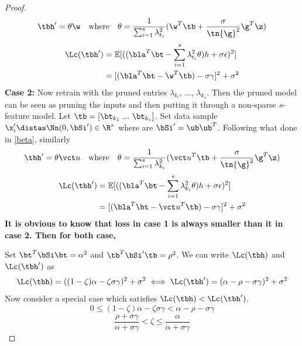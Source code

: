 {\begin{proof}
\[
\tbh'=\theta\w\quad\text{where}\quad\theta=\frac{1}{\sum_{i=1}^s\lambda_{t_i}^2}(\w^T\tb+\frac{\sigma}{\tn{\g}^2}\g^T\z)
\]
\begin{align}
    \Lc(\tbh')&=\mathbb{E}[((\bla^T\bt-\sum_{i=1}^s\lambda_{t_i}^2\theta)h+\sigma\epsilon)^2]\\
    &=[(\bla^T\bt-\w^T\tb)-\sigma\gamma]^2+\sigma^2
\end{align}
\textbf{Case 2: }
Now retrain with the pruned entries $\lambda_{k_!}$, ..., $\lambda_{k_s}$. Then the pruned model can be seen as pruning the inputs and then putting it through a non-sparse $s$-feature model. Let $\tb=[\bt_{k_1}~...~\bt_{k_s}]$. Set data sample $\x_i'\distas \Nn(0,\bSi')\in\R^s$ where are $\bSi'=\ub\ub^T$. Following what done in \ref{beta}, similarly
\[
\tbh'=\theta\vct u\quad\text{where}\quad\theta=\frac{1}{\sum_{i=1}^s\lambda_{k_i}^2}(\vct u^T\tb+\frac{\sigma}{\tn{\g}^2}\g^T\z)
\]
\begin{align}
    \Lc(\tbh')&=\mathbb{E}[((\bla^T\bt-\sum_{i=1}^s\lambda_{k_i}^2\theta)h+\sigma\epsilon)^2]\\
    &=[(\bla^T\bt-\vct u^T\tb)-\sigma\gamma]^2+\sigma^2
\end{align}
\textbf{It is obvious to know that loss in case 1 is always smaller than it in case 2. Then for both case, }

Set $\bt^T\bSi\bt=\alpha^2$ and $\tb^T\bSi'\tb=\rho^2$. We can write $\Lc(\tbh)$ and $\Lc(\tbh')$ as
\[
\Lc(\tbh)=((1-\zeta)\alpha-\zeta\sigma\gamma)^2+\sigma^2\iff\Lc(\tbh')=(\alpha-\rho-\sigma\gamma)^2+\sigma^2
\]
Now consider a special case which satisfies $\Lc(\tbh)<\Lc(\tbh')$.
\[
0\leq(1-\zeta)\alpha-\zeta\sigma\gamma<\alpha-\rho-\sigma\gamma
\]
\[
\frac{\rho+\sigma\gamma}{\alpha+\sigma\gamma}<\zeta\leq\frac{\alpha}{\alpha+\sigma\gamma}
\]
\end{proof}}

